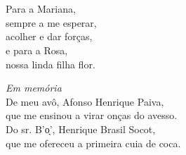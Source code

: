 \newcommand{\data}[1]{\paragraph{#1}}
\setparaheadstyle{\flushright\itshape\footnotesize}
\setafterparaskip{.12\onelineskip}
\chapter*{}
\mbox{}\vspace*{\fill}
\thispagestyle{empty}
\epigraph{
Para a Mariana,\\	
sempre a me esperar,\\
acolher e dar forças,\\
e para a Rosa,\\
nossa linda filha flor.\\
}{}

\medskip
\epigraph{
\textit{Em memória}\\
De meu avô, Afonso Henrique Paiva,\\
que me ensinou a virar onças do avesso.\\
\medskip
Do sr. B’o̖’, Henrique Brasil Socot,\\
que me ofereceu a primeira cuia de coca.
}{}
\vspace*{\fill}